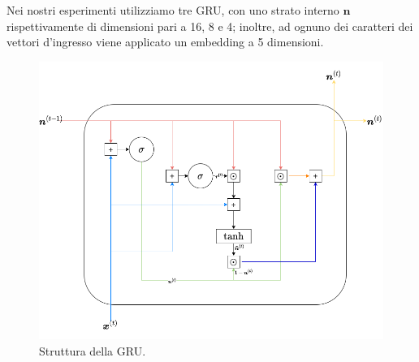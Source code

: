 \documentclass[../../main.tex]{subfiles}
\begin{document}
    Nei nostri esperimenti utilizziamo tre GRU, con uno strato interno $\boldsymbol{n}$ rispettivamente di dimensioni pari a 16, 8 e 4; inoltre, ad ognuno dei caratteri dei vettori d'ingresso viene applicato un embedding a 5 dimensioni.


    \begin{figure}[H]
        \centering
        \includegraphics[width=\textwidth]{immagini/6_4/gruSchema.drawio.png}
        \caption{Struttura della GRU.}
        \label{fig:strutturaGRU}
    \end{figure}
\end{document}
